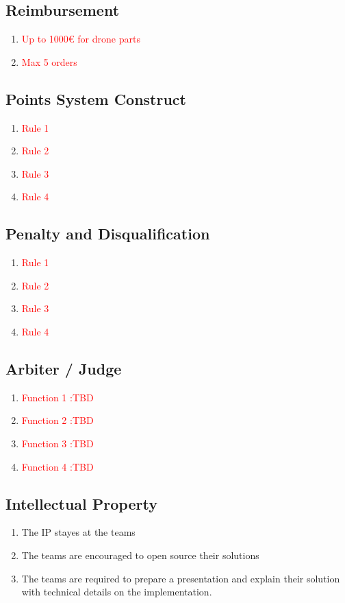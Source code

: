 \subsection{Reimbursement}
\begin{enumerate}
	\item{\textcolor{red}{Up to 1000€ for drone parts}}
	\item{\textcolor{red}{Max 5 orders}}
\end{enumerate}

\subsection{Points System Construct}
\begin{enumerate}
	\item{\textcolor{red}{Rule 1}}
	\item{\textcolor{red}{Rule 2}}
	\item{\textcolor{red}{Rule 3}}
	\item{\textcolor{red}{Rule 4}}
\end{enumerate}

\subsection{Penalty and Disqualification}
\begin{enumerate}
	\item{\textcolor{red}{Rule 1}}
	\item{\textcolor{red}{Rule 2}}
	\item{\textcolor{red}{Rule 3}}
	\item{\textcolor{red}{Rule 4}}
\end{enumerate}

\subsection{Arbiter / Judge}
\begin{enumerate}
	\item{\textcolor{red}{Function 1 :TBD}}
	\item{\textcolor{red}{Function 2 :TBD}}
	\item{\textcolor{red}{Function 3 :TBD}}
	\item{\textcolor{red}{Function 4 :TBD}}
\end{enumerate}

\subsection{Intellectual Property}
\begin{enumerate}
	\item{The IP stayes at the teams}
	\item{The teams are encouraged to open source their solutions}
	\item{The teams are required to prepare a presentation and explain their solution with technical details on the implementation.}
\end{enumerate}

